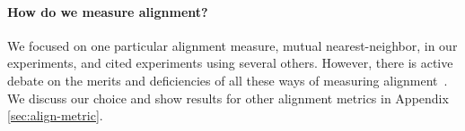 \documentclass{article}
\newcommand{\fixme}[1]{{\bf\color{red}FIXME: #1}}
\theoremstyle{plain}
\theoremstyle{definition}
\theoremstyle{remark}
\begin{document}




\paragraph{
How do we measure alignment?
}
We focused on one particular alignment measure, mutual nearest-neighbor, in our experiments, and cited experiments using several others. However, there is active debate on the merits and deficiencies of all these ways of measuring alignment~\citep{bansal2021revisiting, sucholutsky2023getting}. We discuss our choice and show results for other alignment metrics in Appendix \ref{sec:align-metric}.

\end{document}
